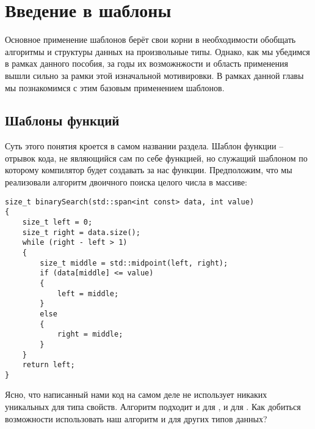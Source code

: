 \chapter{Введение в шаблоны}
Основное применение шаблонов берёт свои корни в необходимости обобщать алгоритмы и структуры данных на произвольные типы. Однако, как мы убедимся в рамках данного пособия, за годы их возможнжости и область применения вышли сильно за рамки этой изначальной мотивировки. В рамках данной главы мы познакомимся с этим базовым применением шаблонов.
\section{Шаблоны функций}
Суть этого понятия кроется в самом названии раздела. Шаблон функции -- отрывок кода, не являющийся сам по себе функцией, но служащий шаблоном по которому компилятор будет создавать за нас функции. Предположим, что мы реализовали алгоритм двоичного поиска целого числа в массиве:
\begin{verbatim}
size_t binarySearch(std::span<int const> data, int value)
{
    size_t left = 0;
    size_t right = data.size();
    while (right - left > 1)
    {
        size_t middle = std::midpoint(left, right);
        if (data[middle] <= value)
        {
            left = middle;
        }
        else
        {
            right = middle;
        }
    }
    return left;
}
\end{verbatim}
Ясно, что написанный нами код на самом деле не использует никаких уникальных для типа  свойств. Алгоритм подходит и для , и для . Как добиться возможности использовать наш алгоритм и для других типов данных?

